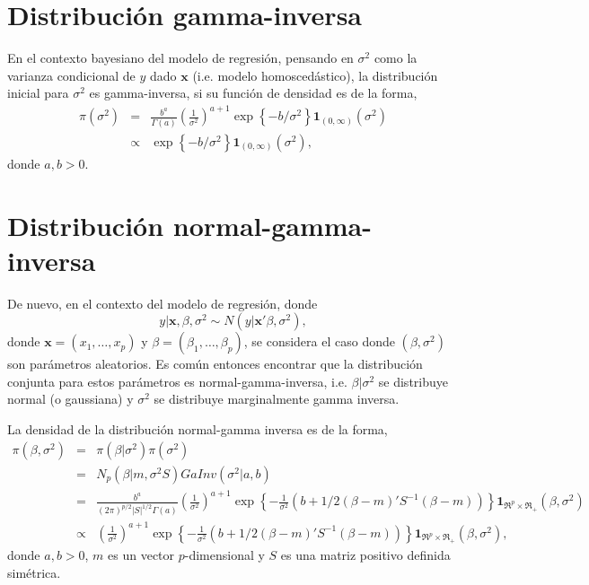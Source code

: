 \documentclass[11pt]{article}
\begin{document}
\section{Distribuci\'on gamma-inversa}

En el contexto bayesiano del modelo de regresi\'on, pensando en $\sigma^{2}$ como la varianza condicional de $y$ dado $\boldsymbol{x}$ (i.e. modelo homosced\'astico), la distribuci\'on inicial para $\sigma^{2}$ es gamma-inversa, si su funci\'on de densidad es de la forma,
\begin{eqnarray}
\pi(\sigma^2) & = & \frac{b^a}{\Gamma(a)}\left(\frac{1}{\sigma^2}\right)^{a+1}\exp\left\{-b/\sigma^2\right\}\boldsymbol{1}_{(0,\infty)}(\sigma^2) \\
& \propto &
\exp\left\{-b/\sigma^2\right\}\boldsymbol{1}_{(0,\infty)}(\sigma^2),
\end{eqnarray}
donde $a,b>0$.

\section{Distribuci\'on normal-gamma-inversa}

De nuevo, en el contexto del modelo de regresi\'on, donde 
\begin{equation}
y|\boldsymbol{x},\beta,\sigma^2 \sim N(y|\boldsymbol{x}'\beta,\sigma^2),
\end{equation}
donde $\boldsymbol{x}=(x_1,\ldots,x_p)$ y $\beta=(\beta_1,\ldots,\beta_p)$, se considera el caso donde $(\beta,\sigma^2)$ son par\'ametros aleatorios. Es com\'un entonces encontrar que la distribuci\'on conjunta para estos par\'ametros es normal-gamma-inversa, i.e. $\beta|\sigma^2$ se distribuye normal (o gaussiana) y $\sigma^2$ se distribuye marginalmente gamma inversa. 

La densidad de la distribuci\'on normal-gamma inversa es de la forma,
\begin{eqnarray}
\pi(\beta,\sigma^2)  
& = &
\pi(\beta|\sigma^2)\pi(\sigma^2) 
\nonumber\\
& = &
N_p(\beta|m,\sigma^2 S)GaInv(\sigma^2|a,b) 
\nonumber\\
& = &
\frac{b^a}{(2\pi)^{p/2}|S|^{1/2}\Gamma(a)}
\left(\frac{1}{\sigma^2}\right)^{a+1}
\exp\left\{-\frac{1}{\sigma^{2}}\left(b+1/2(\beta-m)'S^{-1}(\beta-m)\right)\right\}
\boldsymbol{1}_{\Re^p\times\Re_+}(\beta,\sigma^2)
\nonumber\\
& \propto &
\left(\frac{1}{\sigma^2}\right)^{a+1}
\exp\left\{-\frac{1}{\sigma^{2}}\left(b+1/2(\beta-m)'S^{-1}(\beta-m)\right)\right\}
\boldsymbol{1}_{\Re^p\times\Re_+}(\beta,\sigma^2),
\end{eqnarray} 
donde $a,b>0$, $m$ es un vector $p$-dimensional y $S$ es una matriz positivo definida sim\'etrica.
\end{document}
